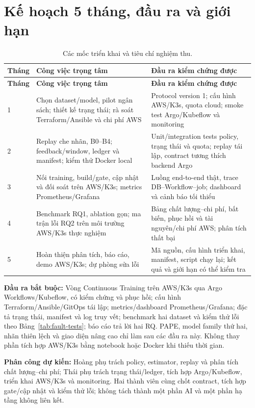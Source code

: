 \section{Kế hoạch 5 tháng, đầu ra và giới hạn}
\begin{xltabular}{\linewidth}{@{}L{1.1cm} Y Y@{}}
\caption{Các mốc triển khai và tiêu chí nghiệm thu.}\label{tab:schedule}\\
\toprule\textbf{Tháng} & \textbf{Công việc trọng tâm} & \textbf{Đầu ra kiểm chứng được} \\
\midrule\endfirsthead
\toprule\textbf{Tháng} & \textbf{Công việc trọng tâm} & \textbf{Đầu ra kiểm chứng được} \\
\midrule{} & Chọn dataset/model, pilot ngân sách; thiết kế trạng thái; rà soát Terraform/Ansible và chi phí AWS & Protocol version 1; cấu hình AWS/K3s, quota cloud; smoke test Argo/Kubeflow và monitoring \\
2 & Replay che nhãn, B0--B4; feedback/window, ledger và manifest; kiểm thử Docker local & Unit/integration tests policy, trạng thái và quota; replay tái lập, contract tương thích backend Argo \\
3 & Nối training, build/gate, cập nhật và đối soát trên AWS/K3s; metrics Prometheus/Grafana & Luồng end-to-end thật, trace DB--Workflow--job; dashboard và cảnh báo tối thiểu \\
4 & Benchmark RQ1, ablation gọn; ma trận lỗi RQ2 trên môi trường AWS/K3s thực nghiệm & Bảng chất lượng--chi phí, bất biến, phục hồi và tài nguyên/chi phí AWS; phân tích thất bại \\
5 & Hoàn thiện phân tích, báo cáo, demo AWS/K3s; dự phòng sửa lỗi & Mã nguồn, cấu hình triển khai, manifest, script chạy lại; kết quả và giới hạn có thể kiểm tra \\
\bottomrule
\end{xltabular}

\textbf{Đầu ra bắt buộc:} Vòng Continuous Training trên AWS/K3s qua Argo Workflows/Kubeflow, có kiểm chứng và phục hồi; cấu hình Terraform/Ansible/GitOps tái lập; metrics/dashboard Prometheus/Grafana; đặc tả trạng thái, manifest và log truy vết; benchmark hai dataset và kiểm thử lỗi theo Bảng~\ref{tab:fault-tests}; báo cáo trả lời hai RQ. PAPE, model family thứ hai, nhãn thiên lệch và giao diện nâng cao chỉ làm sau các đầu ra này. Không thay phần tích hợp AWS/K3s bằng notebook hoặc Docker khi thiếu thời gian.

\textbf{Phân công dự kiến:} Hoàng phụ trách policy, estimator, replay và phân tích chất lượng--chi phí; Thái phụ trách trạng thái/ledger, tích hợp Argo/Kubeflow, triển khai AWS/K3s và monitoring. Hai thành viên cùng chốt contract, tích hợp gate/cập nhật và kiểm thử lỗi; không tách thành một phần AI và một phần hạ tầng không liên kết.

